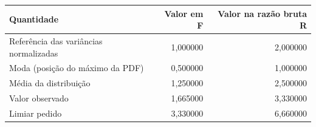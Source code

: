 \begin{tabular}{lrr}
\toprule
Quantidade & Valor em F & Valor na razão bruta R \\
\midrule
Referência das variâncias normalizadas & 1,000000 & 2,000000 \\
Moda (posição do máximo da PDF) & 0,500000 & 1,000000 \\
Média da distribuição & 1,250000 & 2,500000 \\
Valor observado & 1,665000 & 3,330000 \\
Limiar pedido & 3,330000 & 6,660000 \\
\bottomrule
\end{tabular}
